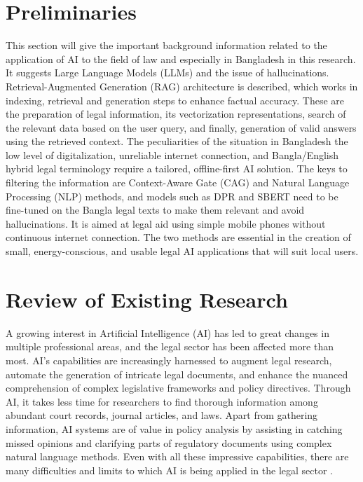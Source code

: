 \section{Preliminaries}

This section will give the important background information related to the application of AI to the field of law and especially in Bangladesh in this research. It suggests Large Language Models (LLMs) and the issue of hallucinations. Retrieval-Augmented Generation (RAG) architecture is described, which works in indexing, retrieval and generation steps to enhance factual accuracy. These are the preparation of legal information, its vectorization representations, search of the relevant data based on the user query, and finally, generation of valid answers using the retrieved context. The peculiarities of the situation in Bangladesh the low level of digitalization, unreliable internet connection, and Bangla/English hybrid legal terminology require a tailored, offline-first AI solution. The keys to filtering the information are Context-Aware Gate (CAG) and Natural Language Processing (NLP) methods, and models such as DPR and SBERT need to be fine-tuned on the Bangla legal texts to make them relevant and avoid hallucinations. It is aimed at legal aid using simple mobile phones without continuous internet connection. The two methods are essential in the creation of small, energy-conscious, and usable legal AI applications that will suit local users.

\section{Review of Existing Research}
A growing interest in Artificial Intelligence (AI) has led to great changes in multiple professional areas, and the legal sector has been affected more than most. AI's capabilities are increasingly harnessed to augment legal research, automate the generation of intricate legal documents, and enhance the nuanced comprehension of complex legislative frameworks and policy directives. Through AI, it takes less time for researchers to find thorough information among abundant court records, journal articles, and laws. Apart from gathering information, AI systems are of value in policy analysis by assisting in catching missed opinions and clarifying parts of regulatory documents using complex natural language methods. Even with all these impressive capabilities, there are many difficulties and limits to which AI is being applied in the legal sector \cite{terzidou2025generative}.

